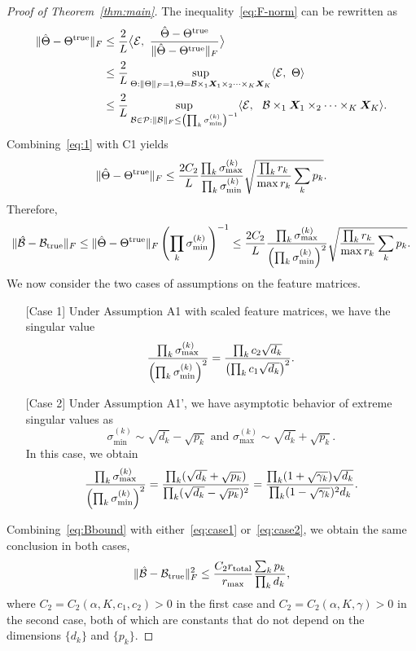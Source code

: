 \documentclass[12pt]{article}
\theoremstyle{definition}
\theoremstyle{definition}
\begin{document}
\begin{proof}[Proof of Theorem~\ref{thm:main}]
The inequality~\eqref{eq:F-norm} can be rewritten as
\begin{align}\label{eq:1}
\FnormSize{}{\hat \Theta-\trueT}&\leq {2\over L}\big\langle \tE,\ {\hat \Theta -\trueT \over \FnormSize{}{\hat \Theta-\trueT}} \big\rangle\notag \\
&\leq {2\over L}\sup_{\Theta: \FnormSize{}{\Theta}=1, \Theta=\tB\times_1\mX_1\times_2\cdots\times_K \mX_K}\langle \tE,\ \Theta \rangle\notag \\
&\leq {2\over L}\sup_{\tB\in\tP: \FnormSize{}{\tB}\leq \left(\prod_k \sigma_{\min}^{(k)}\right)^{-1}} \langle \tE,\ \ \tB\times_1\mX_1\times_2\cdots\times_K\mX_K\rangle.
\end{align}
Combining~\eqref{eq:1} with C1 yields 
\begin{align}\label{eq:theta}
\lVert\hat \Theta-\Theta^{\text{true}}\rVert_F \leq {2C_2\over L} \frac{\prod_k \sigma_{\max}^{(k)}}{\prod_k \sigma_{\min}^{(k)}}\sqrt{{\prod_k r_k \over \max r_k}\sum_k p_k}.
\end{align}
Therefore,
\begin{equation}\label{eq:Bbound}
\lVert\hat {\mathcal{B}}-\mathcal{B}_{\textup{true}}\rVert_F\leq \lVert\hat \Theta-\Theta^{\text{true}}\rVert_F\left(\prod_k \sigma_{\min}^{(k)}\right)^{-1}\leq {2C_2\over L} \frac{\prod_k \sigma_{\max}^{(k)}}{\left(\prod_k \sigma_{\min}^{(k)}\right)^2}\sqrt{{\prod_k r_k \over \max r_k}\sum_k p_k}.
\end{equation}
We now consider the two cases of assumptions on the feature matrices. 
\begin{itemize}[leftmargin=0cm]
\item[] [Case 1] Under Assumption A1 with scaled feature matrices, we have the singular value
\begin{equation}\label{eq:case1}
\frac{\prod_k \sigma_{\max}^{(k)}}{\left(\prod_k \sigma_{\min}^{(k)}\right)^2} = {\prod_k c_2\sqrt{d_k}\over \left(\prod_k c_1\sqrt{d_k}\right)^2}.
\end{equation}
\item[] [Case 2] Under Assumption A1', we have asymptotic behavior of extreme singular values \citep{rudelson2010non} as 
\[
\sigma_{\text{min}}^{(k)} \sim \sqrt{d_k}-\sqrt{p_k} \text{ and  } \sigma_{\text{max}}^{(k)} \sim \sqrt{d_k}+\sqrt{p_k}.
\]
In this case, we obtain 
\begin{equation}\label{eq:case2}
\frac{\prod_k \sigma_{\max}^{(k)}}{\left(\prod_k \sigma_{\min}^{(k)}\right)^2} = {\prod_k (\sqrt{d_k}+\sqrt{p_k})\over \prod_k (\sqrt{d_k}-\sqrt{p_k})^2} =\frac{\prod_k(1+\sqrt{\gamma_k})\sqrt{d_k}}{\prod_k(1-\sqrt{\gamma_k})^2d_k}.
\end{equation}
\end{itemize}
Combining~\eqref{eq:Bbound} with either~\eqref{eq:case1} or~\eqref{eq:case2}, we obtain the same conclusion in both cases,
\[
\lVert\hat {\mathcal{B}}-\mathcal{B}_{\textup{true}}\rVert_F^2\leq \frac{ C_{2} r_{\textup{total}}}{r_{\max}}\frac{\sum_k p_k}{\prod_k d_k},
\]
where $C_2=C_2(\alpha,K,c_1, c_2)>0$ in the first case and $C_2=C_2(\alpha,K,\gamma)>0$ in the second case, both of which are constants that do not depend on the dimensions $\{d_k\}$ and $\{p_k\}$. 


\end{proof}
\end{document}
